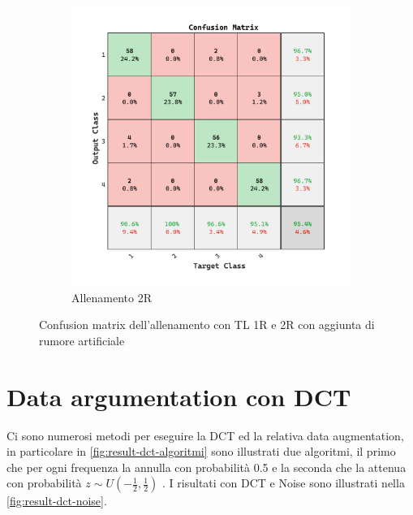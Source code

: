 \begin{figure}[ht]
\begin{subfigure}{0.45\textwidth}
        \includegraphics[width=\textwidth]{addestramento-rete-neurale/two-noise.pdf}
        \caption{Allenamento 2R} 
    \end{subfigure}
    \caption{Confusion matrix dell'allenamento con TL 1R e 2R con aggiunta di rumore artificiale}
    \label{fig:result-noise}
\end{figure}

\section{Data argumentation con DCT}\label{data-argumentation-con-dct}

Ci sono numerosi metodi per eseguire la DCT ed la relativa data augmentation, in particolare in \cref{fig:result-dct-algoritmi} sono illustrati due algoritmi, il primo che per ogni frequenza la annulla con probabilità 0.5 e la seconda che la attenua con probabilità \(z\sim U\left(-\frac{1}{2}, \frac{1}{2}\right)\) \cite{nanni_dct_pca}. I risultati con DCT e Noise sono illustrati nella \cref{fig:result-dct-noise}.

